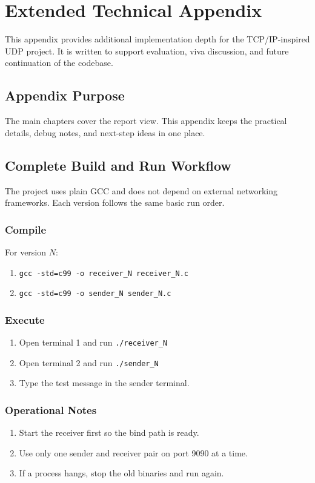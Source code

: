 \chapter{Extended Technical Appendix}

This appendix provides additional implementation depth for the TCP/IP-inspired
UDP project. It is written to support evaluation, viva discussion, and future
continuation of the codebase.

\section{Appendix Purpose}
The main chapters cover the report view. This appendix keeps the practical
details, debug notes, and next-step ideas in one place.

\section{Complete Build and Run Workflow}
The project uses plain GCC and does not depend on external networking
frameworks. Each version follows the same basic run order.

\subsection{Compile}
For version $N$:
\begin{enumerate}
    \item \texttt{gcc -std=c99 -o receiver\_N receiver\_N.c}
    \item \texttt{gcc -std=c99 -o sender\_N sender\_N.c}
\end{enumerate}

\subsection{Execute}
\begin{enumerate}
    \item Open terminal 1 and run \texttt{./receiver\_N}
    \item Open terminal 2 and run \texttt{./sender\_N}
    \item Type the test message in the sender terminal.
\end{enumerate}

\subsection{Operational Notes}
\begin{enumerate}
    \item Start the receiver first so the bind path is ready.
    \item Use only one sender and receiver pair on port 9090 at a time.
    \item If a process hangs, stop the old binaries and run again.
\end{enumerate}

